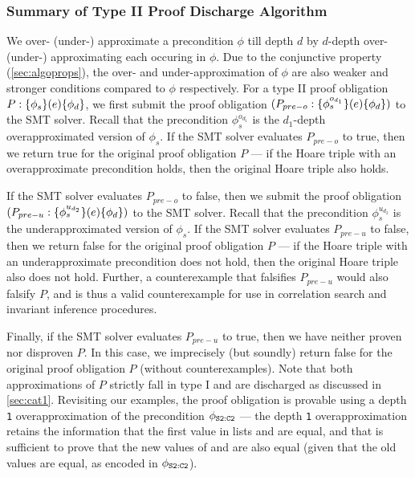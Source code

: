 \subsubsection{Summary of Type II Proof Discharge Algorithm}
\label{cat2summary}
We over- (under-) approximate a precondition $\phi$ till depth $d$ by $d$-depth over- (under-) approximating
each \recursiveRelation{} occuring in $\phi$.
Due to the conjunctive \recursiveRelation{} property (\cref{sec:algoprops}),
the over- and under-approximation of $\phi$ are also weaker and stronger conditions compared to $\phi$
respectively.
For a type II proof obligation $P: \{\phi_s\}(e)\{\phi_d\}$, we first
submit the proof obligation $(P_{pre-o}: \{\phi^{o_{d_1}}_s\}(e)\{\phi_d\})$
to the SMT solver. Recall that the precondition $\phi^{o_{d_1}}_s$
is the $d_1$-depth overapproximated version of $\phi_s$.
If the SMT solver evaluates $P_{{pre-o}}$ to true, then we return true for
the original proof obligation $P$ --- if the
Hoare triple with an overapproximate precondition
holds, then the original Hoare triple
also holds.

If the SMT solver evaluates $P_{pre-o}$ to false, then we submit
the proof obligation $(P_{pre-u}: \{\phi^{u_{d_2}}_s\}(e)\{\phi_d\})$
to the SMT solver. Recall that the precondition $\phi^{u_{d_2}}_s$
is the underapproximated version of $\phi_s$.
If the SMT solver evaluates $P_{pre-u}$ to false, then we return false for
the original proof obligation $P$ --- if the
Hoare triple with an underapproximate precondition
does not hold, then the original Hoare triple
also does not hold. Further, a counterexample that
falsifies $P_{pre-u}$ would also falsify $P$,
and is thus a valid counterexample for use in correlation search and invariant inference procedures.

Finally, if the SMT solver evaluates $P_{pre-u}$ to true, then we have neither
proven nor disproven $P$.
In this case, we imprecisely (but soundly) return false for the
original proof obligation $P$ (without counterexamples).
Note that both approximations of $P$ strictly fall in type I and are
discharged as discussed in \cref{sec:cat1}.
Revisiting our examples, the proof obligation 
is provable using a depth {\tt 1} overapproximation of the
precondition $\phi_{{\tt S2:C2}}$ --- the depth {\tt 1} overapproximation retains the
information that the first value in lists  and 
are equal, and that is sufficient to prove that
the new values of  and  are also equal
(given that the old values are equal, as encoded in $\phi_{{\tt S2:C2}}$).

